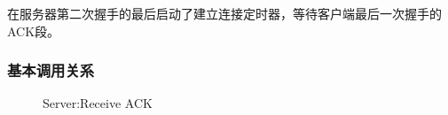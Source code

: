             在服务器第二次握手的最后启动了建立连接定时器，等待客户端最后一次握手的ACK段。           
            \subsubsection{基本调用关系}
                \begin{figure}[htb]        
                    \caption{Server:Receive ACK}
                    \label{Server:Receive ACK}
                \end{figure}  
